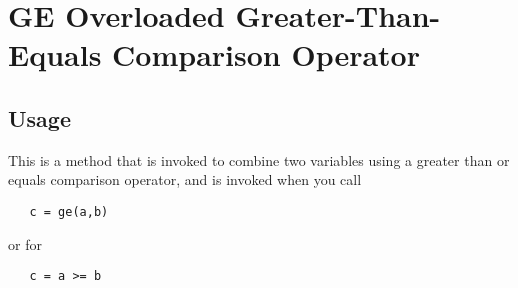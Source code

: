 \section{GE Overloaded Greater-Than-Equals Comparison Operator}

\subsection{Usage}

This is a method that is invoked to combine two variables using a
greater than or equals comparison operator, and is invoked when you call
\begin{verbatim}
   c = ge(a,b)
\end{verbatim}
or for 
\begin{verbatim}
   c = a >= b
\end{verbatim}
